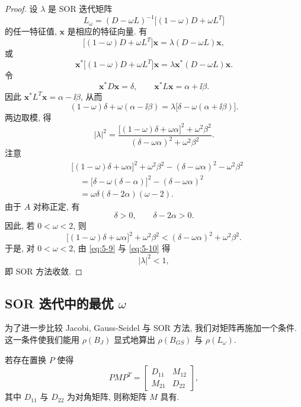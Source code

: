 \begin{proof}
设 $\lambda$ 是 SOR 迭代矩阵
\[
  L_\omega=(D-\omega L)^{-1}\bigl[(1-\omega)D+\omega L^T\bigr]
\]
的任一特征值, $\mathbf{x}$ 是相应的特征向量. 有
\[
  \bigl[(1-\omega)D+\omega L^T\bigr]\mathbf{x}=\lambda(D-\omega L)\mathbf{x},
\]
或
\[
  \mathbf{x}^*\bigl[(1-\omega)D+\omega L^T\bigr]\mathbf{x}
  =\lambda\mathbf{x}^*(D-\omega L)\mathbf{x}.
\]
令
\[
  \mathbf{x}^*D\mathbf{x}=\delta,\qquad \mathbf{x}^*L\mathbf{x}=\alpha+\ii\beta.
\]
因此 $\mathbf{x}^*L^T\mathbf{x}=\alpha-\ii\beta$, 从而
\[
  (1-\omega)\delta+\omega(\alpha-\ii\beta)
  =\lambda\bigl[\delta-\omega(\alpha+\ii\beta)\bigr].
\]
两边取模, 得
\begin{equation}
  |\lambda|^2=
  \frac{\bigl[(1-\omega)\delta+\omega\alpha\bigr]^2+\omega^2\beta^2}
       {(\delta-\omega\alpha)^2+\omega^2\beta^2}.
  \label{eq:5-9}
\end{equation}
注意
\[
  \begin{aligned}
    &\bigl[(1-\omega)\delta+\omega\alpha\bigr]^2+\omega^2\beta^2
     -(\delta-\omega\alpha)^2-\omega^2\beta^2\\
    &\quad=\bigl[\delta-\omega(\delta-\alpha)\bigr]^2-(\delta-\omega\alpha)^2\\
    &\quad=\omega\delta(\delta-2\alpha)(\omega-2).
  \end{aligned}
\]
由于 $A$ 对称正定, 有
\[
  \delta>0,\qquad \delta-2\alpha>0.
\]
因此, 若 $0<\omega<2$, 则
\begin{equation}
  \bigl[(1-\omega)\delta+\omega\alpha\bigr]^2+\omega^2\beta^2
  <(\delta-\omega\alpha)^2+\omega^2\beta^2.
  \label{eq:5-10}
\end{equation}
于是, 对 $0<\omega<2$, 由 \eqref{eq:5-9} 与 \eqref{eq:5-10} 得
\[
  |\lambda|^2<1,
\]
即 SOR 方法收敛.
\end{proof}

\subsection{SOR 迭代中的最优 $\omega$}
\label{subsec:5-4-3}

为了进一步比较 Jacobi, Gauss-Seidel 与 SOR 方法, 我们对矩阵再施加一个条件. 这一条件使我们能用 $\rho(B_J)$ 显式地算出 $\rho(B_{GS})$ 与 $\rho(L_\omega)$.

\begin{definition}
\label{def:5-4}
若存在置换 $P$ 使得
\[
  PMP^T=
  \begin{bmatrix}
    D_{11} & M_{12}\\
    M_{21} & D_{22}
  \end{bmatrix},
\]
其中 $D_{11}$ 与 $D_{22}$ 为对角矩阵, 则称矩阵 $M$ 具有.
\end{definition}

